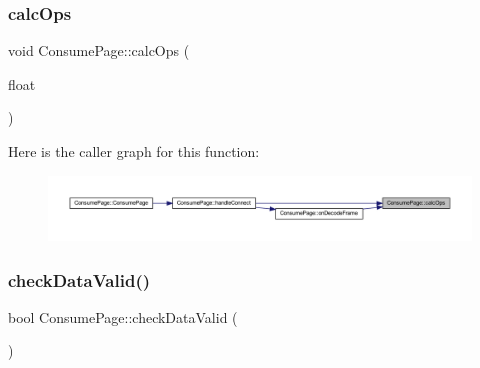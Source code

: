 \subsubsection{\texorpdfstring{calcOps}{calcOps}}
{\footnotesize\ttfamily void Consume\+Page\+::calc\+Ops (\begin{DoxyParamCaption}\item[{float}]{ }\end{DoxyParamCaption})\hspace{0.3cm}{\ttfamily [signal]}}

Here is the caller graph for this function\+:
\nopagebreak
\begin{figure}[H]
\begin{center}
\leavevmode
\includegraphics[width=350pt]{class_consume_page_ac51abb2cb079fc3884f4999d6467ad1b_icgraph}
\end{center}
\end{figure}
\mbox{\label{class_consume_page_a35a81e758924ebde005e01f78eda143f}} 
\subsubsection{\texorpdfstring{checkDataValid()}{checkDataValid()}}
{\footnotesize\ttfamily bool Consume\+Page\+::check\+Data\+Valid (\begin{DoxyParamCaption}{ }\end{DoxyParamCaption})\hspace{0.3cm}{\ttfamily [private]}}

